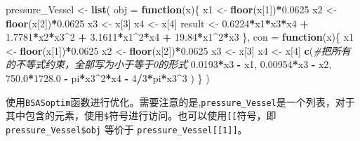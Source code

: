 \documentclass[]{ctexbook}
\newenvironment{Shaded}{\begin{snugshade}}{\end{snugshade}}
\newcommand{\KeywordTok}[1]{\textcolor[rgb]{0.13,0.29,0.53}{\textbf{#1}}}
\newcommand{\DataTypeTok}[1]{\textcolor[rgb]{0.13,0.29,0.53}{#1}}
\newcommand{\DecValTok}[1]{\textcolor[rgb]{0.00,0.00,0.81}{#1}}
\newcommand{\FloatTok}[1]{\textcolor[rgb]{0.00,0.00,0.81}{#1}}
\newcommand{\StringTok}[1]{\textcolor[rgb]{0.31,0.60,0.02}{#1}}
\newcommand{\CommentTok}[1]{\textcolor[rgb]{0.56,0.35,0.01}{\textit{#1}}}
\newcommand{\ControlFlowTok}[1]{\textcolor[rgb]{0.13,0.29,0.53}{\textbf{#1}}}
\newcommand{\OperatorTok}[1]{\textcolor[rgb]{0.81,0.36,0.00}{\textbf{#1}}}
\newcommand{\NormalTok}[1]{#1}
\theoremstyle{definition}
\theoremstyle{definition}
\theoremstyle{definition}
\theoremstyle{remark}
\begin{document}
\begin{Shaded}
\begin{Highlighting}[]
\NormalTok{pressure_Vessel <-}\StringTok{ }\KeywordTok{list}\NormalTok{(}
  \DataTypeTok{obj =} \ControlFlowTok{function}\NormalTok{(x)\{}
\NormalTok{    x1 <-}\StringTok{ }\KeywordTok{floor}\NormalTok{(x[}\DecValTok{1}\NormalTok{])}\OperatorTok{*}\FloatTok{0.0625}
\NormalTok{    x2 <-}\StringTok{ }\KeywordTok{floor}\NormalTok{(x[}\DecValTok{2}\NormalTok{])}\OperatorTok{*}\FloatTok{0.0625}
\NormalTok{    x3 <-}\StringTok{ }\NormalTok{x[}\DecValTok{3}\NormalTok{]}
\NormalTok{    x4 <-}\StringTok{ }\NormalTok{x[}\DecValTok{4}\NormalTok{]}
\NormalTok{    result <-}\StringTok{ }\FloatTok{0.6224}\OperatorTok{*}\NormalTok{x1}\OperatorTok{*}\NormalTok{x3}\OperatorTok{*}\NormalTok{x4 }\OperatorTok{+}\StringTok{ }
\StringTok{      }\FloatTok{1.7781}\OperatorTok{*}\NormalTok{x2}\OperatorTok{*}\NormalTok{x3}\OperatorTok{^}\DecValTok{2} \OperatorTok{+}
\StringTok{      }\FloatTok{3.1611}\OperatorTok{*}\NormalTok{x1}\OperatorTok{^}\DecValTok{2}\OperatorTok{*}\NormalTok{x4 }\OperatorTok{+}\StringTok{ }
\StringTok{      }\FloatTok{19.84}\OperatorTok{*}\NormalTok{x1}\OperatorTok{^}\DecValTok{2}\OperatorTok{*}\NormalTok{x3}
\NormalTok{  \},}
  \DataTypeTok{con =} \ControlFlowTok{function}\NormalTok{(x)\{}
\NormalTok{    x1 <-}\StringTok{ }\KeywordTok{floor}\NormalTok{(x[}\DecValTok{1}\NormalTok{])}\OperatorTok{*}\FloatTok{0.0625}
\NormalTok{    x2 <-}\StringTok{ }\KeywordTok{floor}\NormalTok{(x[}\DecValTok{2}\NormalTok{])}\OperatorTok{*}\FloatTok{0.0625}
\NormalTok{    x3 <-}\StringTok{ }\NormalTok{x[}\DecValTok{3}\NormalTok{]}
\NormalTok{    x4 <-}\StringTok{ }\NormalTok{x[}\DecValTok{4}\NormalTok{]}
    \KeywordTok{c}\NormalTok{(}\CommentTok{#把所有的不等式约束，全部写为小于等于0的形式}
      \FloatTok{0.0193}\OperatorTok{*}\NormalTok{x3 }\OperatorTok{-}\StringTok{ }\NormalTok{x1,}
      \FloatTok{0.00954}\OperatorTok{*}\NormalTok{x3 }\OperatorTok{-}\StringTok{ }\NormalTok{x2,}
      \FloatTok{750.0}\OperatorTok{*}\FloatTok{1728.0} \OperatorTok{-}\StringTok{ }\NormalTok{pi}\OperatorTok{*}\NormalTok{x3}\OperatorTok{^}\DecValTok{2}\OperatorTok{*}\NormalTok{x4 }\OperatorTok{-}\StringTok{ }\DecValTok{4}\OperatorTok{/}\DecValTok{3}\OperatorTok{*}\NormalTok{pi}\OperatorTok{*}\NormalTok{x3}\OperatorTok{^}\DecValTok{3}
\NormalTok{    )}
\NormalTok{  \}}
\NormalTok{)}
\end{Highlighting}
\end{Shaded}

使用\texttt{BSASoptim}函数进行优化。需要注意的是,\texttt{pressure\_Vessel}是一个列表，对于其中包含的元素，使用\texttt{\$}符号进行访问。也可以使用\texttt{{[}{[}}符号，即
\texttt{pressure\_Vessel\$obj} 等价于
\texttt{pressure\_Vessel{[}{[}1{]}{]}}。
\end{document}
